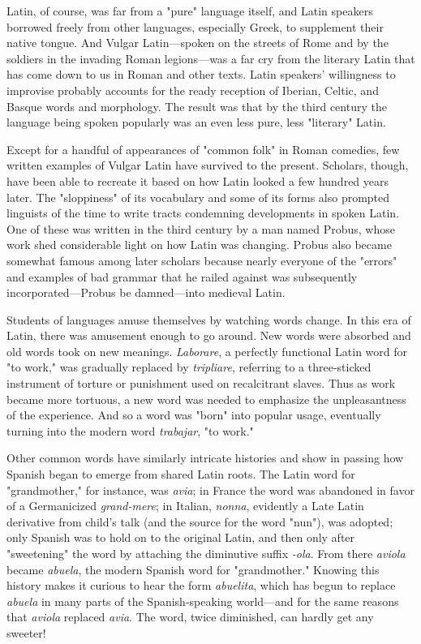 Latin, of course, was far from a "pure" language itself, and
Latin speakers borrowed freely from other languages, especially Greek,
to supplement their native tongue. And Vulgar Latin---spoken on the
streets of Rome and by the soldiers in the invading Roman legions---was a far cry from the literary Latin that has come down to us in Roman and other texts. Latin speakers' willingness to improvise probably
accounts for the ready reception of Iberian, Celtic, and Basque words
and morphology. The result was that by the third century the language
being spoken popularly was an even less pure, less "literary" Latin.

Except for a handful of appearances of "common folk" in Roman comedies, few written examples of Vulgar Latin have survived
to the present. Scholars, though, have been able to recreate it based
on how Latin looked a few hundred years later. The "sloppiness" of
its vocabulary and some of its forms also prompted linguists of the
time to write tracts condemning developments in spoken Latin. One
of these was written in the third century by a man named Probus,
whose work shed considerable light on how Latin was changing. Probus also became somewhat famous among later scholars because
nearly everyone of the "errors" and examples of bad grammar that he
railed against was subsequently incorporated---Probus be damned---into medieval Latin.

Students of languages amuse themselves by watching words
change. In this era of Latin, there was amusement enough to go
around. New words were absorbed and old words took on new meanings. \emph{Laborare}, a perfectly functional Latin word for "to work," was
gradually replaced by \emph{tripliare}, referring to a three-sticked instrument
of torture or punishment used on recalcitrant slaves. Thus as work
became more tortuous, a new word was needed to emphasize the unpleasantness of the experience. And so a word was "born" into popular
usage, eventually turning into the modern word \emph{trabajar}, "to work."

Other common words have similarly intricate histories and
show in passing how Spanish began to emerge from shared Latin roots.
The Latin word for "grandmother," for instance, was \emph{avia}; in France
the word was abandoned in favor of a Germanicized \emph{grand-mere}; in
Italian, \emph{nonna}, evidently a Late Latin derivative from child's talk (and
the source for the word "nun"), was adopted; only Spanish was to hold
on to the original Latin, and then only after "sweetening" the word
by attaching the diminutive suffix \emph{-ola}. From there \emph{aviola} became
\emph{abuela}, the modern Spanish word for "grandmother." Knowing this
history makes it curious to hear the form \emph{abuelita}, which has begun to
replace \emph{abuela} in many parts of the Spanish-speaking world---and for
the same reasons that \emph{aviola} replaced \emph{avia}. The word, twice diminished, can hardly get any sweeter!

